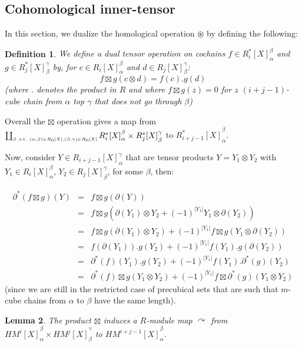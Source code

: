 \documentclass{article}
\newtheorem{definition}{Definition}[section]
\newtheorem{lemma}[definition]{Lemma} %
\begin{document}
\subsection{Cohomological inner-tensor}

In this section, we dualize the homological operation $\circledast$ by defining the following: 

\begin{definition}
We define a dual tensor operation on cochains $f\in R^*_i[X]_\alpha^\beta$ and $g \in R^*_j[X]_\beta^\gamma$ by, for $c \in R_i[X]_\alpha^\beta$ and $d\in R_j[X]_\beta^\gamma$:
$$
f\boxtimes g(c\otimes d) = f(c).g(d)
$$
\noindent (where $.$ denotes the product in $R$ and where $f\boxtimes g(z)=0$ for $z$ $(i+j-1)$-cube chain from $\alpha$ top $\gamma$ that does not go through $\beta$)
\end{definition}

Overall the $\boxtimes$ operation gives a map from $\coprod_{\scriptscriptstyle \beta \mbox{ \tiny s.t. } (\alpha,\beta)\in R_0[X], (\beta,\gamma)\in R_0[X]} {R^*_i[X]}_\alpha^\beta \times {R^*_j[X]}_\beta^\gamma$ to ${R^*_{i+j-1}[X]}_\alpha^\beta$. 

Now, consider $Y \in {R_{i+j-1}[X]}_\alpha^\gamma$ that are tensor products $Y=Y_1\otimes Y_2$ with $Y_1 \in {R_i[X]}_\alpha^\beta$, $Y_2\in {R_j[X]}_\beta^\gamma$, for some $\beta$, then: 

$$
\begin{array}{rcl}
\partial^*(f\boxtimes g)(Y) & = & f\boxtimes g(\partial(Y)) \\
& = & f\boxtimes g(\partial(Y_1)\otimes Y_2+(-1)^{|Y_1|}Y_1\otimes \partial(Y_2)) \\
& = & f\boxtimes g(\partial(Y_1)\otimes Y_2)+(-1)^{|Y_1|}f\boxtimes g(Y_1\otimes \partial(Y_2)) \\
& = & f(\partial(Y_1)).g(Y_2)+(-1)^{|Y_1|}f(Y_1).g(\partial(Y_2)) \\
& = & \partial^*(f)(Y_1).g(Y_2)+(-1)^{|Y_1|}f(Y_1).\partial^*(g)(Y_2) \\
& = & \partial^*(f)\boxtimes g(Y_1\otimes Y_2)+(-1)^{|Y_1|}f\boxtimes \partial^*(g)(Y_1\otimes Y_2)
\end{array}$$
\noindent (since we are still in the restricted case of precubical sets that are such that $m$-cube chains from $\alpha$ to $\beta$ have the same length). 

\begin{lemma}
The product $\boxtimes$ induces a $R$-module map 
$\curvearrowright$ from ${HM^i[X]}_\alpha^\beta \times {HM^j[X]}_\beta^\gamma$ to ${HM^{i+j-1}[X]}_\alpha^\beta$.
\end{lemma}
\end{document}
